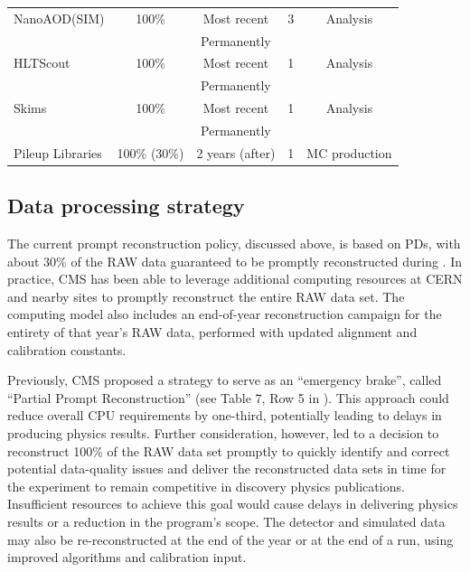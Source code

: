 \begin{table}[tbph]
\begin{tabular}{|l|c|c|c|c|}
    \cellcolor{tablerowheader}
    NanoAOD(SIM)     & 100\%        & Most recent        & 3        & Analysis \\
    \cellcolor{tablerowheader}
                           &              & Permanently        &          & \\ 
    \cellcolor{tablerowheader}
    HLTScout               & 100\%        & Most recent        & 1        & Analysis \\
    \cellcolor{tablerowheader}
                           &              & Permanently        &          &  \\
    \cellcolor{tablerowheader}
    \cellcolor{tablerowheader}
     Skims                 &  100\%       & Most recent        & 1        & Analysis \\
    \cellcolor{tablerowheader}
                           &              & Permanently         &          & \\
    \cellcolor{tablerowheader}
	Pileup Libraries           & 100\% (30\%) & 2 years (after)    & 1        & MC production   \\ \hline
\end{tabular}
\label{tab:storagepolicy2}
\end{table}

\subsection{Data processing strategy}
\label{sec:dataprocessing}

The current prompt reconstruction policy, discussed above, is based on PDs, with about 30\% of the \gls{RAW} data guaranteed to be promptly reconstructed during \RunThree. In practice, CMS has been able to leverage additional computing resources at CERN and nearby \TierOne sites to promptly reconstruct the entire \RunThree \gls{RAW} data set. The \RunThree computing model also includes an end-of-year reconstruction campaign for the entirety of that year's \gls{RAW} data, performed with updated alignment and calibration constants. 

Previously, CMS proposed a strategy to serve as an ``emergency brake'', called ``Partial Prompt Reconstruction'' (see Table 7, Row 5 in \cite{Software:2815292}). This approach could reduce overall \gls{CPU} requirements by one-third, potentially leading to delays in producing physics results. Further consideration, however, led to a decision to reconstruct 100\% of the \gls{RAW} data set promptly to quickly identify and correct potential data-quality issues and deliver the reconstructed data sets in time for the experiment to remain competitive in discovery physics publications. Insufficient resources to achieve this goal would cause delays in delivering physics results or a reduction in the program’s scope. The detector and simulated data may also be re-reconstructed at the end of the year or at the end of a run, using improved algorithms and calibration input.

